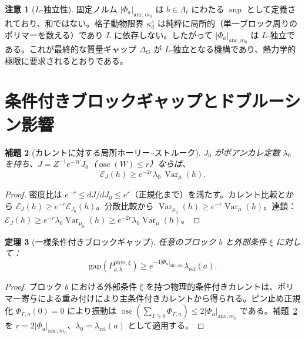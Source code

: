\documentclass[12pt]{article}
\theoremstyle{plain}
\newtheorem{theorem}{定理}[section]
\newtheorem{lemma}[theorem]{補題}
\theoremstyle{definition}
\newtheorem{remark}[theorem]{注意}
\numberwithin{equation}{section}
\newcommand{\Var}{\operatorname{Var}}
\newcommand{\osc}{\operatorname{osc}}
\newcommand{\phys}{\mathrm{phys}}
\begin{document}
\begin{remark}[$L$-独立性]
固定ノルム $|\Phi_a|_{\mathrm{anc},m_0}$ は $b\in\Lambda_\ell$ にわたる $\sup$ として定義されており、和ではない。格子動物限界 $\kappa_d^s$ は純粋に局所的（単一ブロック周りのポリマーを数える）であり $L$ に依存しない。したがって $|\Phi_a|_{\mathrm{anc},m_0}$ は $L$-独立である。これが最終的な質量ギャップ $\Delta_G$ が $L$-独立となる機構であり、熱力学的極限に要求されるとおりである。
\end{remark}

\section{条件付きブロックギャップとドブルーシン影響}\label{sec:blockgap}

\begin{lemma}[カレントに対する局所ホーリー--ストルーク]\label{lem:HS}
$J_0$ がポアンカレ定数 $\lambda_0$ を持ち、$J=Z^{-1}e^{-W}J_0$（$\osc(W)\leq r$）ならば、
\begin{equation}
\mathcal{E}_J(h) \geq e^{-2r}\lambda_0\,\Var_\mu(h).
\end{equation}
\end{lemma}

\begin{proof}
密度比は $e^{-r}\leq dJ/dJ_0\leq e^r$（正規化まで）を満たす。カレント比較とから $\mathcal{E}_J(h)\geq e^{-r}\mathcal{E}_{J_0}(h)$。分散比較から $\Var_{\mu_0}(h)\geq e^{-r}\Var_\mu(h)$。連鎖：$\mathcal{E}_J(h)\geq e^{-r}\lambda_0\Var_{\mu_0}(h)\geq e^{-2r}\lambda_0\Var_\mu(h)$。
\end{proof}

\begin{theorem}[一様条件付きブロックギャップ]\label{thm:conditionalgap}
任意のブロック $b$ と外部条件 $\xi$ に対して：
\begin{equation}
\mathrm{gap}(P_{a,b}^{\phys,\xi}) \geq e^{-4|\Phi_a|_{\mathrm{anc},m_0}}\lambda_{\mathrm{ref}}(a).
\end{equation}
\end{theorem}

\begin{proof}
ブロック $b$ における外部条件 $\xi$ を持つ物理的条件付きカレントは、ポリマー寄与による重み付けにより主条件付きカレントから得られる。ピン止め正規化 $\Phi_{\Gamma,a}(0)=0$ により振動は $\osc(\sum_{\Gamma\ni b}\Phi_{\Gamma,a})\leq 2|\Phi_a|_{\mathrm{anc},m_0}$ である。補題~\ref{lem:HS}を $r=2|\Phi_a|_{\mathrm{anc},m_0}$、$\lambda_0=\lambda_{\mathrm{ref}}(a)$ として適用する。
\end{proof}
\end{document}
